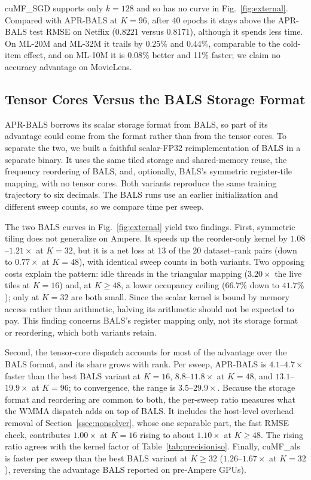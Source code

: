 cuMF\_SGD supports only $k=128$ and so has no curve in Fig.~\ref{fig:external}. Compared with APR-BALS at $K=96$, after 40 epochs it stays above the APR-BALS test RMSE on Netflix ($0.8221$ versus $0.8171$), although it spends less time. On ML-20M and ML-32M it trails by $0.25\%$ and $0.44\%$, comparable to the cold-item effect, and on ML-10M it is $0.08\%$ better and 11\% faster; we claim no accuracy advantage on MovieLens.

\subsection{Tensor Cores Versus the BALS Storage Format}
\label{ssec:balsequiv}

APR-BALS borrows its scalar storage format from BALS, so part of its advantage could come from the format rather than from the tensor cores. To separate the two, we built a faithful scalar-FP32 reimplementation of BALS in a separate binary. It uses the same tiled storage and shared-memory reuse, the frequency reordering of BALS, and, optionally, BALS's symmetric register-tile mapping, with no tensor cores. Both variants reproduce the same training trajectory to six decimals. The BALS runs use an earlier initialization and different sweep counts, so we compare time per sweep.

The two BALS curves in Fig.~\ref{fig:external} yield two findings. First, symmetric tiling does not generalize on Ampere. It speeds up the reorder-only kernel by $1.08$--$1.21\times$ at $K=32$, but it is a net loss at 13 of the 20 dataset--rank pairs (down to $0.77\times$ at $K=48$), with identical sweep counts in both variants. Two opposing costs explain the pattern: idle threads in the triangular mapping ($3.20\times$ the live tiles at $K=16$) and, at $K \ge 48$, a lower occupancy ceiling ($66.7\%$ down to $41.7\%$); only at $K=32$ are both small. Since the scalar kernel is bound by memory access rather than arithmetic, halving its arithmetic should not be expected to pay. This finding concerns BALS's register mapping only, not its storage format or reordering, which both variants retain.

Second, the tensor-core dispatch accounts for most of the advantage over the BALS format, and its share grows with rank. Per sweep, APR-BALS is $4.1$--$4.7\times$ faster than the best BALS variant at $K=16$, $8.8$--$11.8\times$ at $K=48$, and $13.1$--$19.9\times$ at $K=96$; to convergence, the range is $3.5$--$29.9\times$. Because the storage format and reordering are common to both, the per-sweep ratio measures what the WMMA dispatch adds on top of BALS. It includes the host-level overhead removal of Section~\ref{ssec:nonsolver}, whose one separable part, the fast RMSE check, contributes $1.00\times$ at $K=16$ rising to about $1.10\times$ at $K \ge 48$. The rising ratio agrees with the kernel factor of Table~\ref{tab:precisioniso}. Finally, cuMF\_als is faster per sweep than the best BALS variant at $K \ge 32$ ($1.26$--$1.67\times$ at $K=32$), reversing the advantage BALS reported on pre-Ampere GPUs).

